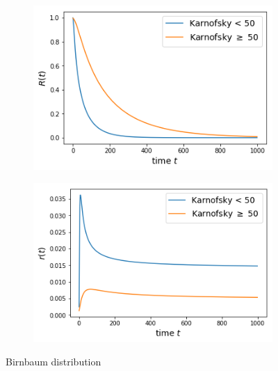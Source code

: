\documentclass[10pt]{article}
\begin{document}
   
 \begin{figure}[htb!]
\centering
    \begin{subfigure}{.4\linewidth}
    \centering
    \includegraphics[width=.99\textwidth]{Images/kar/Sbir.png}
  \end{subfigure}%
    \begin{subfigure}{.4\linewidth}
    \centering
    \includegraphics[width=.99\textwidth]{Images/kar/rbir.png}
  \end{subfigure}%
  \caption{Birnbaum distribution}\label{fig:karexp} 
   \end{figure} 
   
\end{document}
